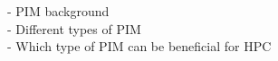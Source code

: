 -	PIM background \\
-	Different types of PIM \\
-	Which type of PIM can be beneficial for HPC \\




  